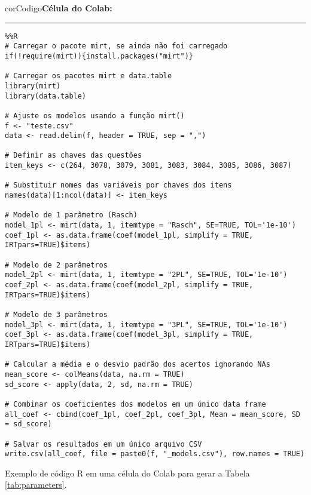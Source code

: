 \renewcommand{\thelisting}{\thechapter.\arabic{listing}} %


\begin{listing}[!ht]
    \begin{myboxCode}{corCodigo}{\textbf{Célula do Colab: }}\vspace{3mm}
    \hrule
    \begin{verbatim}
%%R
# Carregar o pacote mirt, se ainda não foi carregado
if(!require(mirt)){install.packages("mirt")}

# Carregar os pacotes mirt e data.table
library(mirt)
library(data.table)

# Ajuste os modelos usando a função mirt()
f <- "teste.csv"
data <- read.delim(f, header = TRUE, sep = ",")

# Definir as chaves das questões
item_keys <- c(264, 3078, 3079, 3081, 3083, 3084, 3085, 3086, 3087)

# Substituir nomes das variáveis por chaves dos itens
names(data)[1:ncol(data)] <- item_keys

# Modelo de 1 parâmetro (Rasch)
model_1pl <- mirt(data, 1, itemtype = "Rasch", SE=TRUE, TOL='1e-10')
coef_1pl <- as.data.frame(coef(model_1pl, simplify = TRUE, IRTpars=TRUE)$items)

# Modelo de 2 parâmetros
model_2pl <- mirt(data, 1, itemtype = "2PL", SE=TRUE, TOL='1e-10')
coef_2pl <- as.data.frame(coef(model_2pl, simplify = TRUE, IRTpars=TRUE)$items)

# Modelo de 3 parâmetros
model_3pl <- mirt(data, 1, itemtype = "3PL", SE=TRUE, TOL='1e-10')
coef_3pl <- as.data.frame(coef(model_3pl, simplify = TRUE, IRTpars=TRUE)$items)

# Calcular a média e o desvio padrão dos acertos ignorando NAs
mean_score <- colMeans(data, na.rm = TRUE)
sd_score <- apply(data, 2, sd, na.rm = TRUE)

# Combinar os coeficientes dos modelos em um único data frame
all_coef <- cbind(coef_1pl, coef_2pl, coef_3pl, Mean = mean_score, SD = sd_score)

# Salvar os resultados em um único arquivo CSV
write.csv(all_coef, file = paste0(f, "_models.csv"), row.names = TRUE)
\end{verbatim}
\end{myboxCode}
\caption{Exemplo de código R em uma célula do Colab para gerar a Tabela \ref{tab:parameters}.}
\label{lst:tri_estatisticas}
\end{listing}

